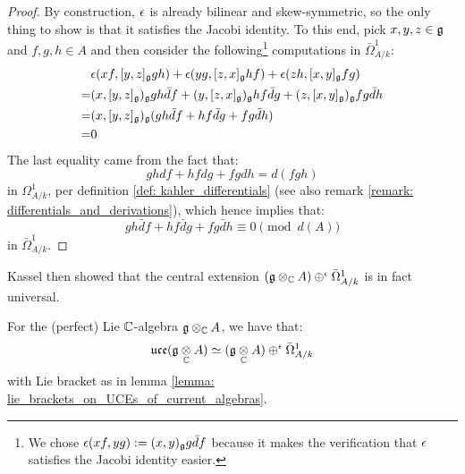             \begin{proof}
                By construction, $\epsilon$ is already bilinear and skew-symmetric, so the only thing to show is that it satisfies the Jacobi identity. To this end, pick $x, y, z \in \mathfrak{g}$ and $f, g, h \in A$ and then consider the following\footnote{We chose $\epsilon(xf, yg) := (x, y)_{\mathfrak{g}} g \bar{d}f$ because it makes the verification that $\epsilon$ satisfies the Jacobi identity easier.} computations in $\bar{\Omega}^1_{A/k}$:
                    $$
                        \begin{aligned}
                            & \epsilon(xf, [y, z]_{\mathfrak{g}} gh) + \epsilon(yg, [z, x]_{\mathfrak{g}} hf) + \epsilon(zh, [x, y]_{\mathfrak{g}} fg)
                            \\
                            = & (x, [y, z]_{\mathfrak{g}})_{\mathfrak{g}} gh \bar{d}f + (y, [z, x]_{\mathfrak{g}})_{\mathfrak{g}} hf \bar{d}g + (z, [x, y]_{\mathfrak{g}})_{\mathfrak{g}} fg \bar{d}h
                            \\
                            = & (x, [y, z]_{\mathfrak{g}})_{\mathfrak{g}} ( gh \bar{d}f + hf \bar{d}g + fg\bar{d}h )
                            \\
                            = & 0
                        \end{aligned}
                    $$
                The last equality came from the fact that:
                    $$gh df + hf dg + fg dh = d(fgh)$$
                in $\Omega^1_{A/k}$, per definition \ref{def: kahler_differentials} (see also remark \ref{remark: differentials_and_derivations}), which hence implies that:
                    $$gh \bar{d}f + hf \bar{d}g + fg \bar{d}h \equiv 0 \pmod{d(A)}$$
                in $\bar{\Omega}^1_{A/k}$.
            \end{proof}
        Kassel then showed that the central extension $(\g \tensor_{\bbC} A) \oplus^{\e} \bar{\Omega}^1_{A/k}$ is in fact universal.
        \begin{theorem} \label{theorem: kassel_realisation}
            \cite[Corollary 3.5]{kassel_universal_central_extensions_of_lie_algebras} For the (perfect) Lie $\mathbb{C}$-algebra $\g \tensor_{\bbC} A$, we have that:
                $$\uce(\g \tensor_{\bbC} A) \cong (\g \tensor_{\bbC} A) \oplus^{\e} \bar{\Omega}^1_{A/k}$$
            with Lie bracket as in lemma \ref{lemma: lie_brackets_on_UCEs_of_current_algebras}.
        \end{theorem}